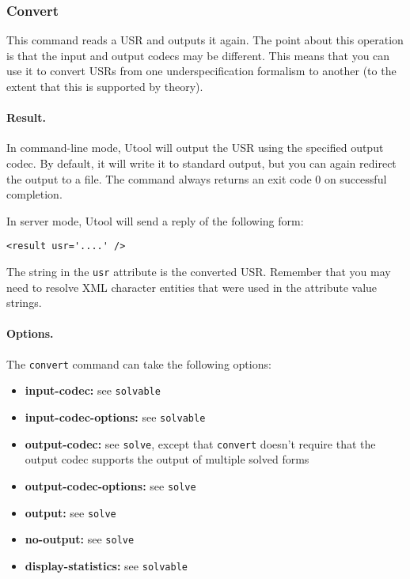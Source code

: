 \subsubsection{Convert}

This command reads a USR and outputs it again. The point about this
operation is that the input and output codecs may be different. This
means that you can use it to convert USRs from one underspecification
formalism to another (to the extent that this is supported by theory).

\paragraph{Result.}
In command-line mode, Utool will output the USR using the specified
output codec. By default, it will write it to standard output, but you
can again redirect the output to a file. The command always returns an
exit code 0 on successful completion.

In server mode, Utool will send a reply of the following form:
\begin{verbatim}
<result usr='....' />
\end{verbatim}

The string in the \verb?usr? attribute is the converted USR. Remember
that you may need to resolve XML character entities that were used in
the attribute value strings.

\paragraph{Options.}
The \verb?convert? command can take the following options:
\begin{itemize}
\item \textbf{input-codec:} see \verb?solvable? 
\item \textbf{input-codec-options:} see \verb?solvable? 
\item \textbf{output-codec:} see \verb?solve?, except that \verb?convert? doesn't require that the output codec supports the output of multiple solved forms
\item \textbf{output-codec-options:} see \verb?solve? 
\item \textbf{output:} see \verb?solve?
\item \textbf{no-output:} see \verb?solve?
\item \textbf{display-statistics:} see \verb?solvable?
\end{itemize}




